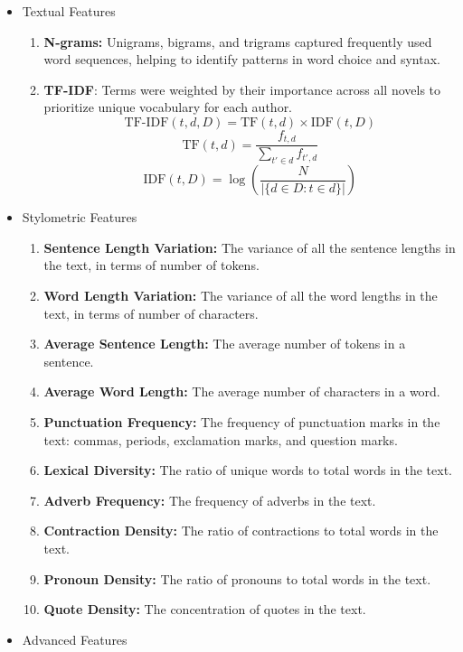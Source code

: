 \documentclass[journal]{IEEEtran} %
\begin{document}
\begin{itemize}
    \item Textual Features
    \begin{enumerate}
        \item \textbf{N-grams:} Unigrams, bigrams, and trigrams captured frequently used word sequences, helping to identify patterns in word choice and syntax. \cite{misini2022}
        \item \textbf{TF-IDF}: Terms were weighted by their importance across all novels to prioritize unique vocabulary for each author. \cite{manning2008}
        $$\text{TF-IDF}(t, d, D) = \text{TF}(t, d) \times \text{IDF}(t, D)$$
        $$\text{TF}(t, d) = \frac{f_{t,d}}{\sum_{t' \in d} f_{t',d}}$$
        $$\text{IDF}(t, D) = \log\left(\frac{N}{| \{d \in D : t \in d \} |}\right)$$
    \end{enumerate}
    \item Stylometric Features
    \begin{enumerate}
        \item \textbf{Sentence Length Variation:} The variance of all the sentence lengths in the text, in terms of number of tokens. \cite{roelleke}
        \item \textbf{Word Length Variation:} The variance of all the word lengths in the text, in terms of number of characters. \cite{misini2022}
        \item \textbf{Average Sentence Length:} The average number of tokens in a sentence.
        \item \textbf{Average Word Length:} The average number of characters in a word.
        \item \textbf{Punctuation Frequency:} The frequency of punctuation marks in the text: commas, periods, exclamation marks, and question marks.
        \item \textbf{Lexical Diversity:} The ratio of unique words to total words in the text.
        \item \textbf{Adverb Frequency:} The frequency of adverbs in the text.
        \item \textbf{Contraction Density:} The ratio of contractions to total words in the text.
        \item \textbf{Pronoun Density:} The ratio of pronouns to total words in the text.
        \item \textbf{Quote Density:} The concentration of quotes in the text.
    \end{enumerate}
    \item Advanced Features

\end{itemize}
\end{document}
